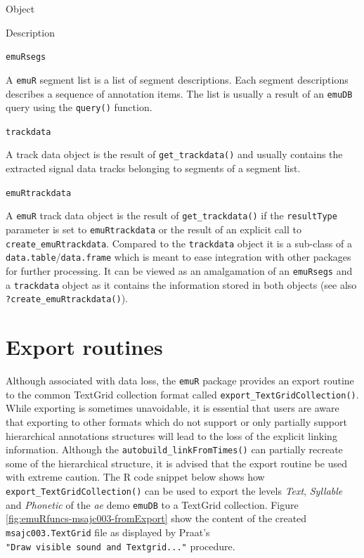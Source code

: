 \documentclass[]{book}
\theoremstyle{definition}
\theoremstyle{definition}
\theoremstyle{definition}
\theoremstyle{remark}
\begin{document}
Object

Description

\texttt{emuRsegs}

A \texttt{emuR} segment list is a list of segment descriptions. Each
segment descriptions describes a sequence of annotation items. The list
is usually a result of an \texttt{emuDB} query using the
\texttt{query()} function.

\texttt{trackdata}

A track data object is the result of \texttt{get\_trackdata()} and
usually contains the extracted signal data tracks belonging to segments
of a segment list.

\texttt{emuRtrackdata}

A \texttt{emuR} track data object is the result of
\texttt{get\_trackdata()} if the \texttt{resultType} parameter is set to
\texttt{emuRtrackdata} or the result of an explicit call to
\texttt{create\_emuRtrackdata}. Compared to the \texttt{trackdata}
object it is a sub-class of a \texttt{data.table}/\texttt{data.frame}
which is meant to ease integration with other packages for further
processing. It can be viewed as an amalgamation of an \texttt{emuRsegs}
and a \texttt{trackdata} object as it contains the information stored in
both objects (see also \texttt{?create\_emuRtrackdata()}).

\hypertarget{sec:emuRpackageDetails-exportRoutines}{%
\section{Export routines}\label{sec:emuRpackageDetails-exportRoutines}}

Although associated with data loss, the \texttt{emuR} package provides
an export routine to the common TextGrid collection format called
\texttt{export\_TextGridCollection()}. While exporting is sometimes
unavoidable, it is essential that users are aware that exporting to
other formats which do not support or only partially support
hierarchical annotations structures will lead to the loss of the
explicit linking information. Although the
\texttt{autobuild\_linkFromTimes()} can partially recreate some of the
hierarchical structure, it is advised that the export routine be used
with extreme caution. The R code snippet below shows how
\texttt{export\_TextGridCollection()} can be used to export the levels
\emph{Text}, \emph{Syllable} and \emph{Phonetic} of the \emph{ae} demo
\texttt{emuDB} to a TextGrid collection. Figure
\ref{fig:emuRfuncs-msajc003-fromExport} show the content of the created
\texttt{msajc003.TextGrid} file as displayed by Praat's
\texttt{"Draw\ visible\ sound\ and\ Textgrid..."} procedure.
\end{document}
